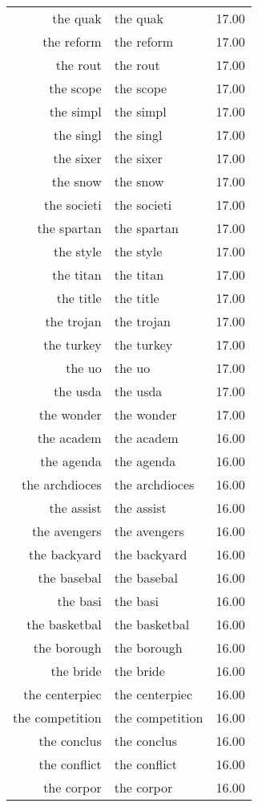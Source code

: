 \begin{table}[ht]
\begin{tabular}{rlr}
  the quak & the quak & 17.00 \\ 
  the reform & the reform & 17.00 \\ 
  the rout & the rout & 17.00 \\ 
  the scope & the scope & 17.00 \\ 
  the simpl & the simpl & 17.00 \\ 
  the singl & the singl & 17.00 \\ 
  the sixer & the sixer & 17.00 \\ 
  the snow & the snow & 17.00 \\ 
  the societi & the societi & 17.00 \\ 
  the spartan & the spartan & 17.00 \\ 
  the style & the style & 17.00 \\ 
  the titan & the titan & 17.00 \\ 
  the title & the title & 17.00 \\ 
  the trojan & the trojan & 17.00 \\ 
  the turkey & the turkey & 17.00 \\ 
  the uo & the uo & 17.00 \\ 
  the usda & the usda & 17.00 \\ 
  the wonder & the wonder & 17.00 \\ 
  the academ & the academ & 16.00 \\ 
  the agenda & the agenda & 16.00 \\ 
  the archdioces & the archdioces & 16.00 \\ 
  the assist & the assist & 16.00 \\ 
  the avengers & the avengers & 16.00 \\ 
  the backyard & the backyard & 16.00 \\ 
  the basebal & the basebal & 16.00 \\ 
  the basi & the basi & 16.00 \\ 
  the basketbal & the basketbal & 16.00 \\ 
  the borough & the borough & 16.00 \\ 
  the bride & the bride & 16.00 \\ 
  the centerpiec & the centerpiec & 16.00 \\ 
  the competition & the competition & 16.00 \\ 
  the conclus & the conclus & 16.00 \\ 
  the conflict & the conflict & 16.00 \\ 
  the corpor & the corpor & 16.00 \\ 

\end{tabular}
\end{table}

